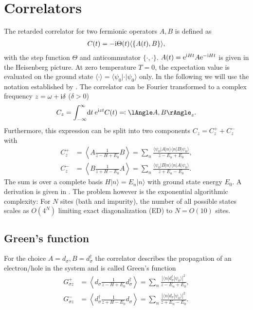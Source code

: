 \section{Correlators}

The retarded correlator for two fermionic operators $A, B$ is defined as
\begin{align}
    C(t) = -\mathrm{i} \Theta(t) \langle\{A(t), B\}\rangle,
\end{align}
with the step function $\Theta$ and anticommutator $\{\cdot,\cdot\}$.
$A(t) = \mathrm{e}^{\mathrm{i} H t} A \mathrm{e}^{-\mathrm{i} H t}$ is given in the Heisenberg picture.
At zero temperature $T=0$, the expectation value is evaluated on the ground state
$\langle\cdot\rangle = \langle\psi_0 | \cdot | \psi_0\rangle$ only.
In the following we will use the notation established by \cite{Bulla1998}.
The correlator can be Fourier transformed to
a complex frequency $z = \omega + \mathrm{i} \delta$ ($\delta > 0$)
\begin{align}
    C_z = \int_{-\infty}^\infty\! \md t\> \me^{\mi zt} C(t) \eqqcolon \lAngle A, B \rAngle_z.
\end{align}
Furthermore, this expression can be split into two components $C_z = C^+_z + C^-_z$ with
\begin{subequations}
    \begin{align}
        C^+_z
         & =
        \left\langle A \frac{1}{z - H + E_0} B\right\rangle
        =
        \sum_n \frac{\langle\psi_0 | A | n\rangle\langle n | B | \psi_0\rangle}{z - E_n + E_0}, \\
        C^-_z
         & =
        \left\langle B \frac{1}{z + H - E_0} A\right\rangle
        =
        \sum_n \frac{\langle\psi_0 | B | n\rangle\langle n | A | \psi_0\rangle}{z + E_n - E_0}.
    \end{align}
\end{subequations}
The sum is over a complete basis $H|n\rangle = E_n|n\rangle$ with ground state energy $E_0$.
A derivation is given in .
The problem however is the exponential algorithmic complexity:
For $N$ sites (bath and impurity), the number of all possible states scales as $O(4^N)$
limiting exact diagonalization (ED) to $N=O(10)$ sites.

\subsection{Green's function}

For the choice $A=d_\sigma, B=d_\sigma^\dag$ the correlator describes
the propagation of an electron/hole in the system and is called Green's function
\begin{subequations}
    \begin{align}
        G^+_{\sigma z}
         & =
        \left\langle d_\sigma \frac{1}{z - H + E_0} d_\sigma^\dag\right\rangle
        =
        \sum_n \frac{|\langle n | d_\sigma^\dag | \psi_0\rangle|^2}{z - E_n + E_0}, \\
        G^-_{\sigma z}
         & =
        \left\langle d_\sigma^\dag \frac{1}{z + H - E_0} d_\sigma\right\rangle
        =
        \sum_n \frac{|\langle n | d_\sigma | \psi_0\rangle|^2}{z + E_n - E_0}.
    \end{align}
\end{subequations}


